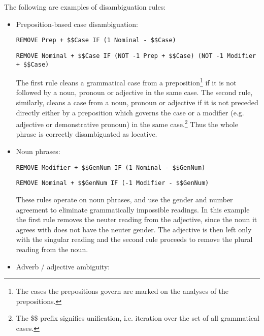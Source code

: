 \documentclass{book}
\begin{document}
The following are examples of disambiguation rules:
\begin{itemize}
\item Preposition-based case disambiguation:\nopagebreak


\texttt{REMOVE Prep + \$\$Case IF (1 Nominal - \$\$Case)}

\texttt{REMOVE Nominal + \$\$Case IF (NOT -1 Prep + \$\$Case) (NOT -1 Modifier + \$\$Case)}

The first rule cleans a grammatical case from a preposition\footnote{The cases the prepositions govern
are marked on the analyses of the prepositions.} 
if it is not followed by a noun, pronoun or adjective in the same case. The second
rule, similarly, cleans a case from a noun, pronoun or adjective if
it is not preceded directly either by a preposition which governs the case
or a modifier (e.g. adjective or demonstrative pronoun) in the same case.\footnote{The \$\$ prefix signifies unification, i.e. iteration over the set of all
grammatical cases.}
Thus the whole phrase is correctly disambiguated as locative.

\item Noun phrases:


\texttt{REMOVE Modifier + \$\$GenNum IF (1 Nominal - \$\$GenNum)}

\texttt{REMOVE Nominal + \$\$GenNum IF (-1 Modifier - \$\$GenNum)}

These rules operate on noun phrases, and use the gender and number agreement
to eliminate grammatically impossible readings. 
In this example the first rule removes the neuter reading from the 
adjective, since the noun it agrees with does not have the neuter gender.
The adjective is then left only with the singular reading and the second rule 
proceeds to remove the plural reading from the noun.

\item Adverb / adjective ambiguity:

\end{itemize}
\end{document}
